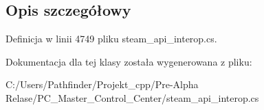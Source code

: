\subsection{Opis szczegółowy}


Definicja w linii 4749 pliku steam\+\_\+api\+\_\+interop.\+cs.



Dokumentacja dla tej klasy została wygenerowana z pliku\+:\begin{DoxyCompactItemize}
\item 
C\+:/\+Users/\+Pathfinder/\+Projekt\+\_\+cpp/\+Pre-\/\+Alpha Relase/\+P\+C\+\_\+\+Master\+\_\+\+Control\+\_\+\+Center/steam\+\_\+api\+\_\+interop.\+cs\end{DoxyCompactItemize}
